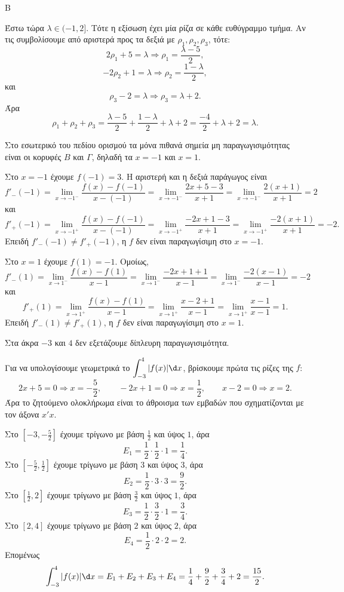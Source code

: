 \begin{thema}{Β}
\begin{erwthma}
Έστω τώρα $\lambda\in(-1,2]$. Τότε η εξίσωση έχει μία ρίζα σε κάθε ευθύγραμμο τμήμα. Αν τις συμβολίσουμε από αριστερά προς τα δεξιά με $\rho_1,\rho_2,\rho_3$, τότε:
\[
2\rho_1+5=\lambda\Rightarrow \rho_1=\frac{\lambda-5}{2},
\]
\[
-2\rho_2+1=\lambda\Rightarrow \rho_2=\frac{1-\lambda}{2},
\]
και
\[
\rho_3-2=\lambda\Rightarrow \rho_3=\lambda+2.
\]
Άρα
\[
\rho_1+\rho_2+\rho_3
=\frac{\lambda-5}{2}+\frac{1-\lambda}{2}+\lambda+2
=\frac{-4}{2}+\lambda+2
=\lambda.
\]

\item Στο εσωτερικό του πεδίου ορισμού τα μόνα πιθανά σημεία μη παραγωγισιμότητας είναι οι κορυφές $B$ και $\Gamma$, δηλαδή τα $x=-1$ και $x=1$.

Στο $x=-1$ έχουμε $f(-1)=3$. Η αριστερή και η δεξιά παράγωγος είναι
\[
f'_-(-1)=\lim_{x\to -1^-}\frac{f(x)-f(-1)}{x-(-1)}
=\lim_{x\to -1^-}\frac{2x+5-3}{x+1}
=\lim_{x\to -1^-}\frac{2(x+1)}{x+1}=2
\]
και
\[
f'_+(-1)=\lim_{x\to -1^+}\frac{f(x)-f(-1)}{x-(-1)}
=\lim_{x\to -1^+}\frac{-2x+1-3}{x+1}
=\lim_{x\to -1^+}\frac{-2(x+1)}{x+1}=-2.
\]
Επειδή $f'_-(-1)\neq f'_+(-1)$, η $f$ δεν είναι παραγωγίσιμη στο $x=-1$.

Στο $x=1$ έχουμε $f(1)=-1$. Ομοίως,
\[
f'_-(1)=\lim_{x\to 1^-}\frac{f(x)-f(1)}{x-1}
=\lim_{x\to 1^-}\frac{-2x+1+1}{x-1}
=\lim_{x\to 1^-}\frac{-2(x-1)}{x-1}=-2
\]
και
\[
f'_+(1)=\lim_{x\to 1^+}\frac{f(x)-f(1)}{x-1}
=\lim_{x\to 1^+}\frac{x-2+1}{x-1}
=\lim_{x\to 1^+}\frac{x-1}{x-1}=1.
\]
Επειδή $f'_-(1)\neq f'_+(1)$, η $f$ δεν είναι παραγωγίσιμη στο $x=1$.

Στα άκρα $-3$ και $4$ δεν εξετάζουμε δίπλευρη παραγωγισιμότητα.

\item Για να υπολογίσουμε γεωμετρικά το $\dint_{-3}^{4}|f(x)|\d x$, βρίσκουμε πρώτα τις ρίζες της $f$:
\[
2x+5=0\Rightarrow x=-\frac{5}{2},\qquad
-2x+1=0\Rightarrow x=\frac{1}{2},\qquad
x-2=0\Rightarrow x=2.
\]
Άρα το ζητούμενο ολοκλήρωμα είναι το άθροισμα των εμβαδών που σχηματίζονται με τον άξονα $x'x$.

Στο $\left[-3,-\frac{5}{2}\right]$ έχουμε τρίγωνο με βάση $\frac{1}{2}$ και ύψος $1$, άρα
\[
E_1=\frac{1}{2}\cdot\frac{1}{2}\cdot 1=\frac{1}{4}.
\]
Στο $\left[-\frac{5}{2},\frac{1}{2}\right]$ έχουμε τρίγωνο με βάση $3$ και ύψος $3$, άρα
\[
E_2=\frac{1}{2}\cdot 3\cdot 3=\frac{9}{2}.
\]
Στο $\left[\frac{1}{2},2\right]$ έχουμε τρίγωνο με βάση $\frac{3}{2}$ και ύψος $1$, άρα
\[
E_3=\frac{1}{2}\cdot\frac{3}{2}\cdot 1=\frac{3}{4}.
\]
Στο $[2,4]$ έχουμε τρίγωνο με βάση $2$ και ύψος $2$, άρα
\[
E_4=\frac{1}{2}\cdot 2\cdot 2=2.
\]
Επομένως
\[
\dint_{-3}^{4}|f(x)|\d x
=E_1+E_2+E_3+E_4
=\frac{1}{4}+\frac{9}{2}+\frac{3}{4}+2
=\frac{15}{2}.
\]
\end{erwthma}
\end{thema}

